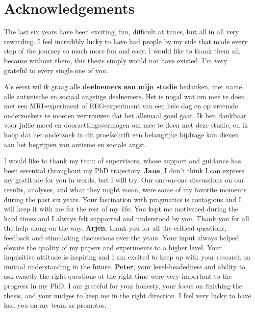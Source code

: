 \chapter*{Acknowledgements}
\label{ch:acknowledgements}

The last six years have been exciting, fun, difficult at times, but all in all very rewarding. I feel incredibly lucky to have had people by my side that made every step of the journey so much more fun and easy. I would like to thank them all, because without them, this thesis simply would not have existed. I'm very grateful to every single one of you.

Als eerst wil ik graag alle \textbf{deelnemers aan mijn studie} bedanken, met name alle autistische en sociaal angstige deelnemers. Het is nogal wat om mee te doen met een MRI-experiment of EEG-experiment van een hele dag en op vreemde onderzoekers te moeten vertrouwen dat het allemaal goed gaat. Ik ben dankbaar voor jullie moed en doorzettingsvermogen om mee te doen met deze studie, en ik hoop dat het onderzoek in dit proefschrift een belangrijke bijdrage kan dienen aan het begrijpen van autisme en sociale angst. 

I would like to thank my team of supervisors, whose support and guidance has been essential throughout my PhD trajectory. \newline 
\textbf{Jana}, I don't think I can express my gratitude for you in words, but I will try. Our one-on-one discussions on our results, analyses, and what they might mean, were some of my favorite moments during the past six years. Your fascination with pragmatics is contagious and I will keep it with me for the rest of my life. You kept me motivated during the hard times and I always felt supported and understood by you. Thank you for all the help along on the way. \newline
\textbf{Arjen}, thank you for all the critical questions, feedback and stimulating discussions over the years. Your input always helped elevate the quality of my papers and experiments to a higher level. Your inquisitive attitude is inspiring and I am excited to keep up with your research on mutual understanding in the future. \newline
\textbf{Peter}, your level-headedness and ability to ask exactly the right questions at the right time were very important to the progress in my PhD. I am grateful for your honesty, your focus on finishing the thesis, and your nudges to keep me in the right direction. I feel very lucky to have had you on my team as promotor. 

